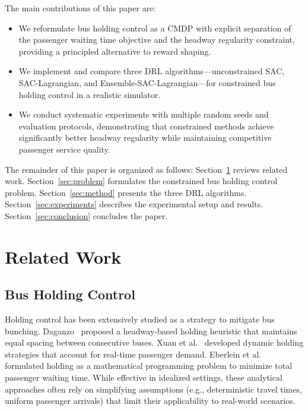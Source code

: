 \documentclass[10pt]{article}
\begin{document}
The main contributions of this paper are:
\begin{itemize}
    \item We reformulate bus holding control as a CMDP with explicit separation of the passenger waiting time objective and the headway regularity constraint, providing a principled alternative to reward shaping.
    \item We implement and compare three DRL algorithms---unconstrained SAC, SAC-Lagrangian, and Ensemble-SAC-Lagrangian---for constrained bus holding control in a realistic simulator.
    \item We conduct systematic experiments with multiple random seeds and evaluation protocols, demonstrating that constrained methods achieve significantly better headway regularity while maintaining competitive passenger service quality.
\end{itemize}

The remainder of this paper is organized as follows: Section~\ref{sec:related} reviews related work. Section~\ref{sec:problem} formulates the constrained bus holding control problem. Section~\ref{sec:method} presents the three DRL algorithms. Section~\ref{sec:experiments} describes the experimental setup and results. Section~\ref{sec:conclusion} concludes the paper.


\section{Related Work}
\label{sec:related}

\subsection{Bus Holding Control}

Holding control has been extensively studied as a strategy to mitigate bus bunching. Daganzo~\cite{Daganzo2009Headway} proposed a headway-based holding heuristic that maintains equal spacing between consecutive buses. Xuan et al.~\cite{Xuan2011Dynamic} developed dynamic holding strategies that account for real-time passenger demand. Eberlein et al.~\cite{Eberlein2001Holding} formulated holding as a mathematical programming problem to minimize total passenger waiting time. While effective in idealized settings, these analytical approaches often rely on simplifying assumptions (e.g., deterministic travel times, uniform passenger arrivals) that limit their applicability to real-world scenarios.
\end{document}
